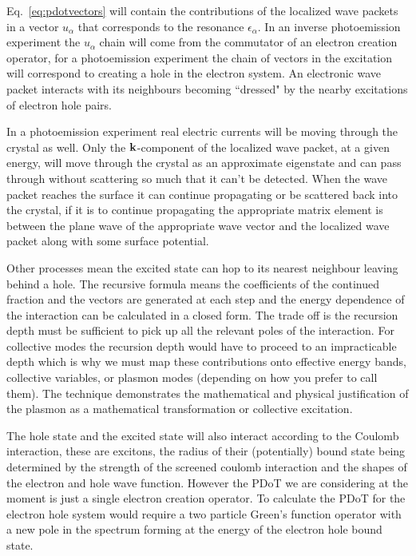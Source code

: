 Eq.~\ref{eq:pdotvectors} will contain the contributions of the localized
wave packets in a vector $u_{\alpha}$ that corresponds to the resonance 
$\epsilon_{\alpha}$. In an inverse photoemission experiment the $u_{\alpha}$ chain
will come from the commutator of an electron creation operator, for a photoemission
experiment the chain of vectors in the excitation will correspond to creating a hole
in the electron system. An electronic wave packet interacts with its neighbours becoming
``dressed" by the nearby excitations of electron hole pairs. 

In a photoemission experiment real electric currents will be moving through the crystal as well.
Only the ${\bf k}$-component of the localized wave packet, at a given energy, will move through the crystal as 
an approximate eigenstate and can pass through without scattering so much that it can't be detected.
When the wave packet reaches the surface it can continue propagating
or be scattered back into the crystal, if it is to continue propagating the appropriate matrix element
is between the plane wave of the appropriate wave vector and the localized wave packet along with some
surface potential.

Other processes mean the excited state can hop 
to its nearest neighbour leaving behind a hole. The recursive formula means
the coefficients of the continued fraction and the vectors are generated at
each step and the energy dependence of the interaction can be calculated 
in a closed form. The trade off is the recursion depth must be sufficient to
pick up all the relevant poles of the interaction. For collective modes
the recursion depth would have to proceed to an impracticable depth which
is why we must map these contributions onto effective energy bands, collective
variables, or plasmon modes (depending on how you prefer to call them). 
The technique demonstrates the mathematical and physical justification 
of the plasmon as a mathematical transformation or collective excitation.

The hole state and the excited state will also interact according 
to the Coulomb interaction, these are excitons, the radius of their (potentially) 
bound state being determined by the strength of the screened coulomb interaction 
and the shapes of the electron and hole wave function. 
However the PDoT we are considering at the moment is just a single electron creation operator.
To calculate the PDoT for the electron hole system would require a 
two particle Green's function operator with a new pole in the spectrum forming
at the energy of the electron hole bound state.


